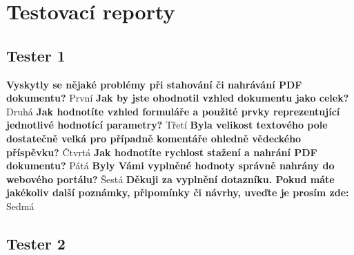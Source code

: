 \chapter{Testovací reporty}

\section{Tester 1}

\textbf{Vyskytly se nějaké problémy při stahování či nahrávání PDF dokumentu?}
\newline
První
\newline
\newline
\textbf{Jak by jste ohodnotil vzhled dokumentu jako celek?}
\newline
Druhá
\newline
\newline
\textbf{Jak hodnotíte vzhled formuláře a použité prvky reprezentující jednotlivé hodnotící parametry?}
\newline
Třetí
\newline
\newline
\textbf{Byla velikost textového pole dostatečně velká pro případně komentáře ohledně vědeckého příspěvku?}
\newline
Čtvrtá
\newline
\newline
\textbf{Jak hodnotíte rychlost stažení a nahrání PDF dokumentu?} 
\newline
Pátá
\newline
\newline
\textbf{Byly Vámi vyplněné hodnoty správně nahrány do webového portálu?}
\newline
Šestá
\newline
\newline
\textbf{Děkuji za vyplnění dotazníku. Pokud máte jakékoliv další poznámky, připomínky či návrhy, uveďte je prosím zde:}
\newline
Sedmá
\newpage 

\section{Tester 2}

